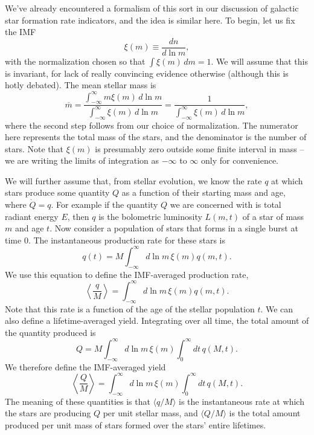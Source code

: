 We've already encountered a formalism of this sort in our discussion of galactic star formation rate indicators, and the idea is similar here. To begin, let us fix the IMF
\begin{equation}
\xi(m) \equiv \frac{dn}{d\ln m},
\end{equation}
with the normalization chosen so that $\int \xi(m) \, dm = 1$. We will assume that this is invariant, for lack of really convincing evidence otherwise (although this is hotly debated). The mean stellar mass is
\begin{equation}
\overline{m} = \frac{\int_{-\infty}^\infty m \xi(m) \, d\ln m}{\int_{-\infty}^\infty \xi(m) \, d\ln m} = \frac{1}{\int_{-\infty}^\infty \xi(m) \, d\ln m},
\end{equation}
where the second step follows from our choice of normalization. The numerator here represents the total mass of the stars, and the denominator is the number of stars. Note that $\xi(m)$ is presumably zero outside some finite interval in mass -- we are writing the limits of integration as $-\infty$ to $\infty$ only for convenience.

We will further assume that, from stellar evolution, we know the rate $q$ at which stars produce some quantity $Q$ as a function of their starting mass and age, where $\dot{Q} = q$. For example if the quantity $Q$ we are concerned with is total radiant energy $E$, then $q$ is the bolometric luminosity $L(m,t)$ of a star of mass $m$ and age $t$. Now consider a population of stars that forms in a single burst at time 0. The instantaneous production rate for these stars is
\begin{equation}
q(t) = M \int_{-\infty}^{\infty} d\ln m \, \xi(m) q(m,t).
\end{equation}
We use this equation to define the IMF-averaged production rate,
\begin{equation}
\left\langle \frac{q}{M}\right\rangle = \int_{-\infty}^{\infty} d\ln m \, \xi(m) q(m,t).
\end{equation}
Note that this rate is a function of the age of the stellar population $t$. We can also define a lifetime-averaged yield. Integrating over all time, the total amount of the quantity produced is
\begin{equation}
Q = M \int_{-\infty}^{\infty} d\ln m \, \xi(m) \int_0^\infty dt\, q(M,t).
\end{equation}
We therefore define the IMF-averaged yield
\begin{equation}
\left\langle \frac{Q}{M} \right\rangle = \int_{-\infty}^{\infty} d\ln m \, \xi(m) \int_0^\infty dt\, q(M,t).
\end{equation}
The meaning of these quantities is that $\langle q/M\rangle$ is the instantaneous rate at which the stars are producing $Q$ per unit stellar mass, and $\langle Q/M\rangle$ is the total amount produced per unit mass of stars formed over the stars' entire lifetimes.

